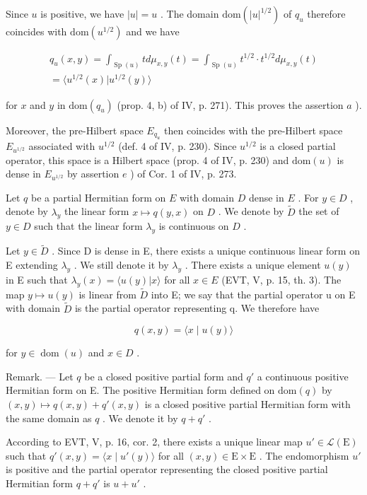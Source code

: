 Since \(u\) is positive, we have \(|u| = u\) . The domain \(\mathrm{dom}(|u|^{1/2})\) of \(q_u\) therefore coincides with \(\mathrm{dom}(u^{1/2})\) and we have

\[
\begin{array}{c} q _ {u} (x, y) = \int_ {\operatorname{Sp} (u)} t d \mu_ {x, y} (t) = \int_ {\operatorname{Sp} (u)} t ^ {1 / 2} \cdot t ^ {1 / 2} d \mu_ {x, y} (t) \\ = \langle u ^ {1 / 2} (x) | u ^ {1 / 2} (y) \rangle \end{array}
\]

for \(x\) and \(y\) in \(\mathrm{dom}(q_u)\) (prop. 4, b) of IV, p. 271). This proves the assertion \(a\) ).

Moreover, the pre-Hilbert space \(E_{q_{u}}\) then coincides with the pre-Hilbert space \(E_{u^{1/2}}\) associated with \(u^{1/2}\) (def. 4 of IV, p. 230). Since \(u^{1/2}\) is a closed partial operator, this space is a Hilbert space (prop. 4 of IV, p. 230) and \(\text{dom}(u)\) is dense in \(E_{u^{1/2}}\) by assertion \(e\) ) of Cor. 1 of IV, p. 273.

Let \(q\) be a partial Hermitian form on \(E\) with domain \(D\) dense in \(E\) . For \(y \in D\) , denote by \(\lambda_y\) the linear form \(x \mapsto q(y, x)\) on \(D\) . We denote by \(\widetilde{D}\) the set of \(y \in D\) such that the linear form \(\lambda_y\) is continuous on \(D\) .

Let \(y \in \widetilde{D}\) . Since D is dense in E, there exists a unique continuous linear form on E extending \(\lambda_{y}\) . We still denote it by \(\lambda_{y}\) . There exists a unique element \(u(y)\) in E such that \(\lambda_{y}(x) = \langle u(y) | x \rangle\) for all \(x \in E\) (EVT, V, p. 15, th. 3). The map \(y \mapsto u(y)\) is linear from \(\widetilde{D}\) into E; we say that the partial operator u on E with domain \(\widetilde{D}\) is the partial operator representing q. We therefore have

\[
q (x, y) = \langle x \mid u (y) \rangle
\]

for \(y \in \operatorname{dom}(u)\) and \(x \in D\) .

Remark. --- Let \(q\) be a closed positive partial form and \(q'\) a continuous positive Hermitian form on E. The positive Hermitian form defined on \(\text{dom}(q)\) by \((x, y) \mapsto q(x, y) + q'(x, y)\) is a closed positive partial Hermitian form with the same domain as \(q\) . We denote it by \(q + q'\) .

According to EVT, V, p. 16, cor. 2, there exists a unique linear map \(u' \in \mathcal{L}(\mathrm{E})\) such that \(q'(x,y) = \langle x \mid u'(y) \rangle\) for all \((x,y) \in \mathrm{E} \times \mathrm{E}\) . The endomorphism \(u'\) is positive and the partial operator representing the closed positive partial Hermitian form \(q + q'\) is \(u + u'\) .

